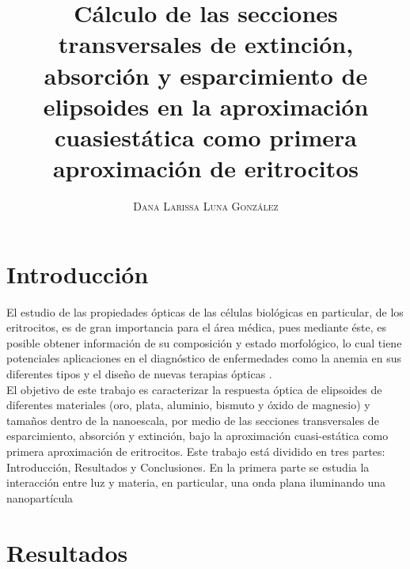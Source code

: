 \documentclass[paper=letter,8.5pt]{article}
\title{\vspace{-15mm}\fontsize{17pt}\selectfont\textbf{Cálculo de las secciones transversales de extinción, absorción y esparcimiento de elipsoides en la aproximación cuasiestática como primera aproximación de eritrocitos }} %
\author{
\large
{\textsc{ Dana Larissa Luna González}}\\[2mm]}
\date{}
\begin{document}
\maketitle %
\thispagestyle{fancy} %
\section{Introducción}
El estudio de las propiedades ópticas de las células biológicas en particular, de los eritrocitos, es de gran importancia para el área médica, pues mediante éste, es posible obtener información de su composición y estado morfológico, lo cual tiene potenciales aplicaciones en el diagnóstico de enfermedades como la anemia en sus diferentes tipos y el diseño de nuevas terapias ópticas \cite{Blood}. \\

El objetivo de este trabajo es caracterizar la respuesta óptica de elipsoides de diferentes materiales (oro, plata, aluminio, bismuto y óxido de magnesio) y tamaños dentro de la nanoescala, por medio de las secciones transversales de esparcimiento, absorción y extinción, bajo la aproximación cuasi-estática como primera aproximación de eritrocitos. Este trabajo está dividido en tres partes: Introducción, Resultados y Conclusiones. En la primera parte se estudia la interacción entre luz y materia, en particular, una onda plana iluminando una nanopartícula\\








\section{Resultados}

\end{document}
